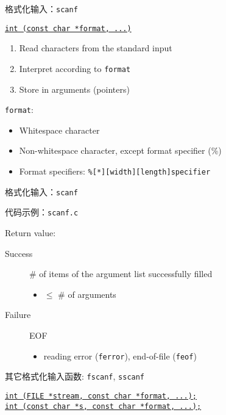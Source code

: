 \begin{frame}{格式化输入：\texttt{scanf}}
  \centerline{\href{http://www.cplusplus.com/reference/cstdio/scanf/}
  {\texttt{int (const char *format, ...)}}}

  \vspace{0.30cm}
  \begin{enumerate}
    \item Read characters from the standard input
    \item Interpret according to \texttt{format}
    \item Store in arguments (pointers)
  \end{enumerate}

  \vspace{0.30cm}
  \pause
  \texttt{format}:
  \begin{itemize}
    \item Whitespace character
    \item Non-whitespace character, except format specifier (\%)
    \item Format specifiers: \texttt{\%[*][width][length]specifier}
  \end{itemize}
\end{frame}

\begin{frame}{格式化输入：\texttt{scanf}}
  \centerline{代码示例：\texttt{scanf.c}}

  \vspace{0.60cm}
  Return value:
  \begin{description}
    \item[Success] \# of items of the argument list successfully filled
      \begin{itemize}
	\item $\le$ \# of arguments
      \end{itemize}
    \item[Failure] EOF
      \begin{itemize}
	\item reading error (\texttt{ferror}), end-of-file (\texttt{feof})
      \end{itemize}
  \end{description}
\end{frame}

\begin{frame}{其它格式化输入函数: \texttt{fscanf}, \texttt{sscanf}}
  \begin{center}
    \href{http://www.cplusplus.com/reference/cstdio/fscanf/}
    {\texttt{int (FILE *stream, const char *format, ...);}} \\[0.50cm]

    \href{http://www.cplusplus.com/reference/cstdio/sscanf/}
    {\texttt{int (const char *s, const char *format, ...);}}
  \end{center}
\end{frame}

